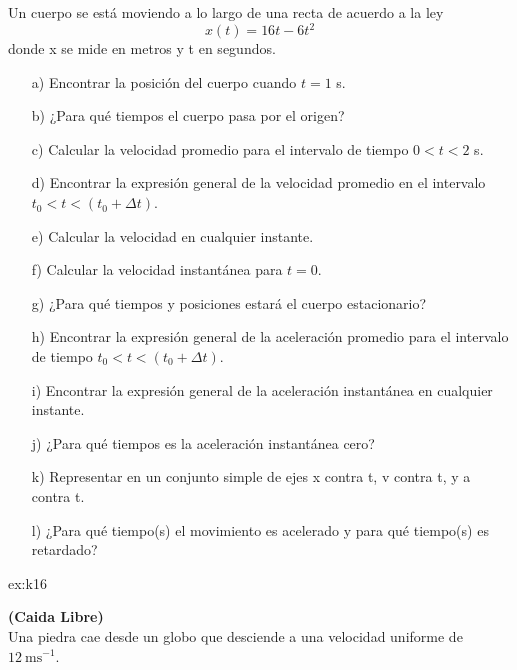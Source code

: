 \begin{multicols}{2}
\begin{excercise}[][]
{         Un cuerpo se está moviendo a lo largo de una recta de acuerdo a la ley
            \begin{equation*}
              x(t)=16t-6t^2  
            \end{equation*}
         donde x se mide en metros y t en segundos. 
        \begin{itemize}
            \item[a)] Encontrar la posición del cuerpo cuando $t = 1$ s.  
            \item[b)] ¿Para qué tiempos el cuerpo pasa por el origen?
            \item[c)] Calcular la velocidad promedio para el intervalo de tiempo $0 <t<2$ s.    
            \item[d)] Encontrar la expresión general de la velocidad promedio en el intervalo $t_0 < t < (t_0 + \Delta t)$. 
            \item[e)] Calcular la velocidad en cualquier instante.
            \item[f)] Calcular la velocidad instantánea para $t=0$.
            \item[g)] ¿Para qué tiempos y posiciones estará el cuerpo estacionario? 
            \item[h)] Encontrar la expresión general de la aceleración promedio para el intervalo de tiempo $t_0 <t < (t_0 + \Delta t)$.
            \item[i)] Encontrar la expresión general de la aceleración instantánea en cualquier instante. 
            \item[j)] ¿Para qué tiempos es la aceleración instantánea cero? 
            \item[k)] Representar en un conjunto simple de ejes x contra t, v contra t, y a contra t. 
            \item[l)]  ¿Para qué tiempo(s) el movimiento es acelerado y para qué tiempo(s) es retardado? 
        \end{itemize}
        }
    \end{excercise}
    \begin{excercise}[][][a) $v=-110\ \mathrm{ms^{-1}}$,  $x=610\ \mathrm{m}$; b)  $v=-86\ \mathrm{ms^{-1}}$,  $x=-370\ \mathrm{m}$;]{ex:k16}{
         \textbf{(Caida Libre)}\\ 
         Una piedra cae desde un globo que desciende a una velocidad uniforme de $12\  \mathrm{ms^{-1}}$. 
            \begin{itemize}

\end{itemize}}
\end{excercise}
\end{multicols}
